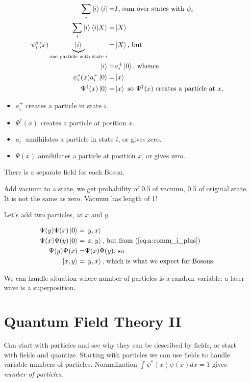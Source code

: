 \documentclass[]{article}
\begin{document}
\begin{align*}
\sum_{i} \ket{i} \bra{i} =& I \text{, sum over states with $\psi_i$}\\
\sum_{i} \ket{i} \braket{i|X} =& \ket{X}\\
\psi^*_i(x)\underbrace{\ket{i}}_\text{one particle with state $i$} =& \ket{X}\text{, but}\\
\ket{i} =& a^+_i\ket{0} \text{, whence}\\
\psi^*_i(x) a^+_i\ket{0}=&\ket{x}\\
\Psi^\dagger(x) \ket{0} =& \ket{x}\text{ so $\Psi^\dagger(x)$ creates a particle at $x$.}
\end{align*}

\begin{itemize}
	\item $a^+_i$ creates a particle in state $i$.
	\item $\Psi^\dagger(x)$  creates a particle at position $x$.
	\item $a^-_i$ annihilates a particle in state $i$, or gives zero.
	\item $\Psi(x)$  annihilates a particle at position $x$, or gives zero.
\end{itemize}

There is a separate field for each Boson.

Add vacuum to a state, we get probability of 0.5 of vacuum, 0.5 of original state. It is not the same as zero. Vacuum has length of 1!

Let's add two particles, at $x$ and $y$. 
 
\begin{align*}
\Psi(y)\Psi(x)\ket{0} =& \ket{y,x}\\
\Psi(x)\Psi(y)\ket{0} =& \ket{x,y} \text{, but from (\ref {eq:a:comm_i_plus})}\\
\Psi(y)\Psi(x) =& \Psi(x)\Psi(y) \text{, so}\\
\ket{x,y} =& \ket{y,x} \text{, which is what we expect for Bosons.} 
\end{align*}

We can handle situation where number of particles is a random variable: a laser wave is a superposition.

\section{Quantum Field Theory II}

Can start with particles and see why they can be described by fields, or start with fields and quantize. Starting with particles we can use fields to handle variable numbers of particles. Normalization $\int \psi^*(x) \psi(x) dx=1$ gives \textit{number of particles}.
\end{document}
